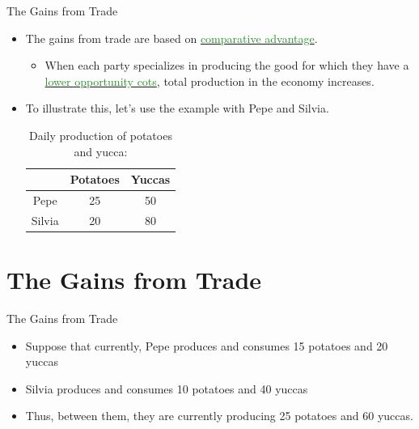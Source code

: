 \documentclass[xcolor={dvipsnames},pdf, hyperref={colorlinks=true, citecolor=ForestGreen, linkcolor=BlueViolet, urlcolor=Magenta}]{beamer}
\theoremstyle{definition}
\newcommand{\dd}[1]{{\underline{\textcolor{ForestGreen}{#1}}}}
\begin{document}
\begin{frame}{The Gains from Trade}
	
		\begin{itemize}
			
			\item 	The gains from trade are based on \dd{comparative advantage}. 
				\begin{itemize}
					\item When each party specializes in producing the good for which they have a  \dd{lower opportunity cots}, total production in the economy increases. 
				\end{itemize}
			\item 	To illustrate this, let's use the example with Pepe and Silvia.
			
			\begin{table}[H]
				\caption*{Daily production of potatoes and yucca:}
				\centering
				\begin{tabular}{ c|c|c|}        
					
					& Potatoes & Yuccas \\
					\hline
					Pepe & 25 & 50  \\
					
					Silvia  & 20 & 80  \\
					
				\end{tabular}
			\end{table}
		\end{itemize}

\section{The Gains from Trade}
	
\end{frame}


\begin{frame}{The Gains from Trade}
	
\begin{itemize}
	\item Suppose that currently, Pepe produces and consumes 15 potatoes and 20 yuccas
	\item Silvia produces and consumes 10 potatoes and 40 yuccas
	\item Thus, between them, they are currently producing 25 potatoes and 60 yuccas.

\end{itemize}
		
\end{frame}
\end{document}

